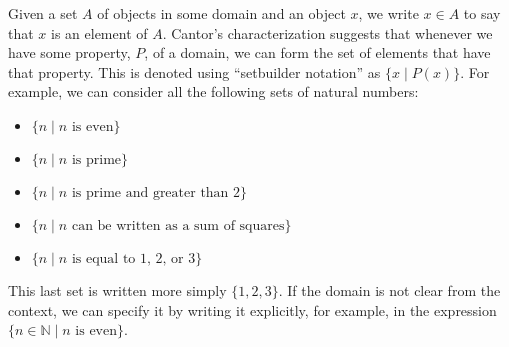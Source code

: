 \documentclass[letterpaper,10pt,english]{sphinxmanual}
\begin{document}
\sphinxAtStartPar
Given a set \(A\) of objects in some domain and an object \(x\), we write \(x \in A\) to say that \(x\) is an element of \(A\). Cantor’s characterization suggests that whenever we have some property, \(P\), of a domain, we can form the set of elements that have that property. This is denoted using “set\sphinxhyphen{}builder notation” as \(\{ x \mid P(x) \}\). For example, we can consider all the following sets of natural numbers:
\begin{itemize}
\item {} 
\sphinxAtStartPar
\(\{n \mid \mbox{$n$ is even} \}\)

\item {} 
\sphinxAtStartPar
\(\{n \mid \mbox{$n$ is prime} \}\)

\item {} 
\sphinxAtStartPar
\(\{n \mid \mbox{$n$ is prime and greater than 2} \}\)

\item {} 
\sphinxAtStartPar
\(\{n \mid \mbox{$n$ can be written as a sum of squares} \}\)

\item {} 
\sphinxAtStartPar
\(\{n \mid \mbox{$n$ is equal to 1, 2, or 3}\}\)

\end{itemize}

\sphinxAtStartPar
This last set is written more simply \(\{1, 2, 3\}\). If the domain is not clear from the context, we can specify it by writing it explicitly, for example, in the expression \(\{n \in \mathbb{N} \mid \text{$n$ is even} \}\).
\end{document}
